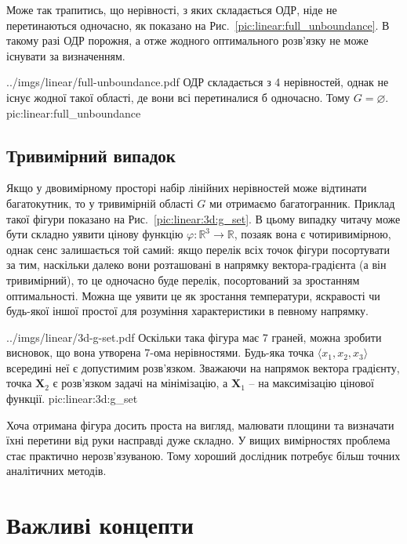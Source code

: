 \documentclass[\main/book.tex]{subfiles}
\begin{document}
Може так трапитись, що нерівності, з яких складається ОДР, ніде не перетинаються одночасно, як показано на Рис.~\ref{pic:linear:full_unboundance}. В такому разі ОДР порожня, а отже жодного оптимального розв'язку не може існувати за визначенням.

\illustration
 {../imgs/linear/full-unboundance.pdf}
 {ОДР складається з 4 нерівностей, однак не існує жодної такої області, де вони всі перетиналися б одночасно. Тому $G = \varnothing$.}
 {pic:linear:full_unboundance}

\subsection{Тривимірний випадок}

Якщо у двовимірному просторі набір лінійних нерівностей може відтинати багатокутник, то у тривимірній області $G$ ми отримаємо багатогранник. Приклад такої фігури показано на Рис.~\ref{pic:linear:3d:g_set}. В цьому випадку читачу може бути складно уявити цінову функцію ${\varphi: \mathbb{R}^3 \rightarrow \mathbb{R}}$, позаяк вона є чотиривимірною, однак сенс залишається той самий: якщо перелік всіх точок фігури посортувати за тим, наскільки \flqq{}далеко\frqq{} вони розташовані в напрямку вектора-градієнта (а він тривимірний), то це одночасно буде перелік, посортований за зростанням оптимальності. Можна ще уявити це як зростання температури, яскравості чи будь-якої іншої простої для розуміння характеристики в певному напрямку.

\illustration
 {../imgs/linear/3d-g-set.pdf}
 {Оскільки така фігура має 7 граней, можна зробити висновок, що вона утворена 7-ома нерівностями. Будь-яка точка $\langle x_1, x_2, x_3 \rangle$ всередині неї є допустимим розв'язком. Зважаючи на напрямок вектора градієнту, точка $\mathbf{X}_2$ є розв'язком задачі на мінімізацію, а $\mathbf{X}_1$ -- на максимізацію цінової функції.}
 {pic:linear:3d:g_set}
 
\begin{note}
 Хоча отримана фігура досить проста на вигляд, малювати площини та визначати їхні перетини від руки насправді дуже складно. У вищих вимірностях проблема стає практично нерозв'язуваною. Тому хороший дослідник потребує більш точних аналітичних методів.
\end{note}

\section{Важливі концепти}
\end{document}

